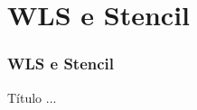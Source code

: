 \documentclass[../main/main.tex]{subfiles}
\begin{document}
	
\section{WLS e Stencil }



\begin{frame}
	\frametitle{WLS e Stencil }
\end{frame}



\begin{frame}{Título}
	...
\end{frame}
\end{document}
